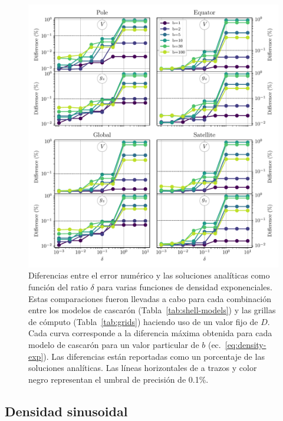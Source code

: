 \begin{figure}
\centering
\includegraphics[width=\linewidth]{figs/tesseroids-variable-density/exponential-density-diffs.pdf}
\caption{
    Diferencias entre el error numérico y las soluciones analíticas como
    función del ratio $\delta$ para varias funciones de densidad exponenciales.
    Estas comparaciones fueron llevadas a cabo para cada combinación entre los
    modelos de cascarón (Tabla~\ref{tab:shell-models}) y las grillas de cómputo
    (Tabla~\ref{tab:grids}) haciendo uso de un valor fijo de $D$. Cada curva
    corresponde a la diferencia máxima obtenida para cada modelo de cascarón
    para un valor particular de $b$ (ec.~\ref{eq:density-exp}). Las diferencias
    están reportadas como un porcentaje de las soluciones analíticas. Las
    líneas horizontales de a trazos y color negro representan el umbral de
    precisión de 0.1\%.
    }
\label{fig:delta-exponential}
\end{figure}


\subsection{Densidad sinusoidal}

